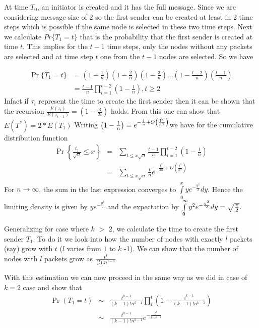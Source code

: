 At time $T_0$, an initiator is created and it has the full message. Since we are considering 
message size of $2$ so the first sender can be created at least in 2 time steps which is possible
 if the same node is selected in these two time steps. Next we calculate 
$Pr\{T_1=t\}$ that is the probability that the  first sender is created at time $t$. This implies
for the $t-1$ time steps, only the nodes without any packets are selected and at time step $t$ one 
from the $t-1$ nodes are selected. So we have


\begin{align*}
\Pr \{ T_{1}=t\} &=(1-\frac{1}{n})(1-\frac{2}{n})(1-\frac{3}{n})...(1-\frac{t-2}{n})(\frac{t-1}{n}) \\ 
 &=\frac{t-1}{n}\prod\limits_{l=1}^{t-2}( 1-%
\frac{l}{n}) ,t\geq 2
\end{align*}
Infact if $\tau_i$ represent the time to create the first sender then it can be shown that the recursion  $\frac{E\left( \tau _{i}\right) }{E\left(
\tau _{i-1}\right) }=\left( 1-\frac{3}{2i}\right) $ holds. 
From this one can show that $E(T^*)=2*E(T_1)$
Writing $\left( 1-\frac{l}{n}\right) =e^{-\frac{l}{n}+O\left( \frac{l^{2}}{%
n^{2}}\right) }$we have for the cumulative distribution function 
\begin{eqnarray*}
\Pr \left\{ \frac{t_{1}}{\sqrt{n}}\leq x\right\}  &=&\sum\limits_{t\leq x%
\sqrt{n}}\frac{t-1}{n}\prod\limits_{l=1}^{t-2}\left( 1-\frac{l}{n}\right)  \\
&=&\sum\limits_{t\leq x\sqrt{n}}\frac{t}{n}e^{-\frac{t^{2}}{2n}+O\left( 
\frac{t^{3}}{n^{2}}\right) }
\end{eqnarray*}%
For $n\rightarrow \infty $, the sum in the last expression converges to $%
\int\limits_{0}^{x}ye^{-\frac{y^{2}}{2}}dy.$  Hence the limiting density is
given by $ye^{-\frac{y^{2}}{2}}$ and the expectation by $\int\limits_{0}^{%
\infty }y^{2}e^{-\frac{y^{2}}{2}}dy=\sqrt{\frac{\pi }{2}}.$
\fi

Generalizing for case where $k$ $>$ 2, we calculate the time to create the first sender $T_1$. To do it we look into how the number of nodes with exactly $l$ packets (say)
grow with $t$ ($l$ varies from $1$ to $k$ -1). 
We can show that the number of nodes with $l$ packets 
 grow  as $\frac{%
t^{l}}{\left( l\right) !n^{l-1}}$

With this estimation we can now proceed in the same way as we did in case of $k=2$ case and show that 
\begin{eqnarray*}
\Pr \left( T_{1}=t\right) &\sim &\frac{t^{k-1}}{\left( k-1\right) !n^{k-1}}%
\prod\limits_{i}^{t}\left( 1-\frac{i^{k-1}}{\left( k-1\right) !n^{k-1}}%
\right) \\
&\sim &\frac{t^{k-1}}{\left( k-1\right) !n^{k-1}}e^{-\frac{t^{k}}{k!n^{k-1}}}
\end{eqnarray*}%

